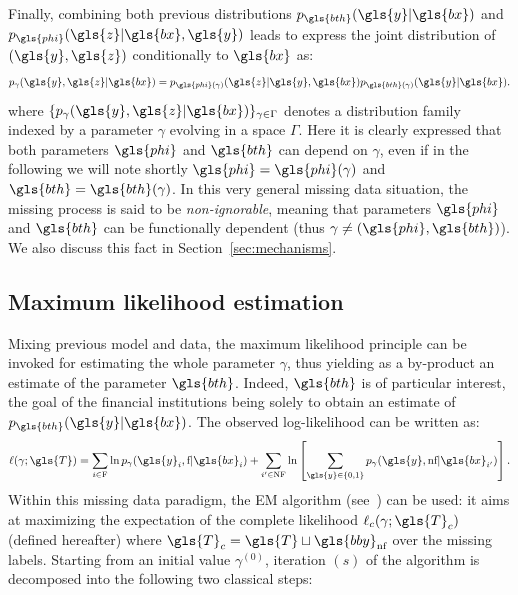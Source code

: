 Finally, combining both previous distributions $p_{\gls{bth}}(\gls{y}|\gls{bx})$ and $p_{\gls{phi}}(\gls{z}|\gls{bx},\gls{y})$ leads to express the joint distribution of $(\gls{y},\gls{z})$ conditionally to $\gls{bx}$ as:
\begin{equation}\label{eq:generative}
p_{\gamma}(\gls{y},\gls{z}|\gls{bx}) = p_{\gls{phi}(\gamma)}(\gls{z}|\gls{y},\gls{bx})p_{\gls{bth}(\gamma)}(\gls{y}|\gls{bx}).
\end{equation}
where $\{p_{\gamma}(\gls{y},\gls{z}|\gls{bx})\}_{\gamma \in \Gamma}$ denotes a distribution family indexed by a parameter $\gamma$ evolving in a space $\Gamma$. Here it is clearly expressed that both parameters $\gls{phi}$ and $\gls{bth}$ can depend on $\gamma$, even if in the following we will note shortly $\gls{phi}=\gls{phi}(\gamma)$ and $\gls{bth}=\gls{bth}(\gamma)$. In this very general missing data situation, the missing process is said to be {\it non-ignorable}, meaning that parameters $\gls{phi}$ and $\gls{bth}$ can be functionally dependent (thus $\gamma\neq (\gls{phi},\gls{bth})$). We also discuss this fact in Section~\ref{sec:mechanisms}.

\subsection{Maximum likelihood estimation} 
\label{sec:EM}

Mixing previous model and data, the maximum likelihood principle can be invoked for estimating the whole parameter $\gamma$, thus yielding as a by-product an estimate of the parameter $\gls{bth}$. Indeed, $\gls{bth}$ is of particular interest, the goal of the financial institutions being solely to obtain an estimate of $p_{\gls{bth}}(\gls{y}|\gls{bx})$. The observed log-likelihood can be written as:
\begin{equation}\label{eq:like.MNAR}
\ell(\gamma;\gls{T}) = \sum_{i\in\text{F}}\ln p_{\gamma}(\gls{y}_i,\text{f} | \gls{bx}_i) + \sum_{i'\in\text{NF}} \ln \left[ \sum_{\gls{y}\in\{0,1\}} p_{\gamma}(\gls{y},\text{nf} | \gls{bx}_{i'}) \right].
\end{equation}
Within this missing data paradigm, the EM algorithm (see~\cite{dempster1977maximum}) can be used: it aims at maximizing the expectation of the complete likelihood $\ell_c(\gamma;\gls{T}_c)$ (defined hereafter) where $\gls{T}_c = \gls{T} \sqcup \gls{bby}_{\text{nf}}$ over the missing labels. Starting from an initial value $\gamma^{(0)}$, iteration $(s)$ of the algorithm is decomposed into the following two classical steps:
